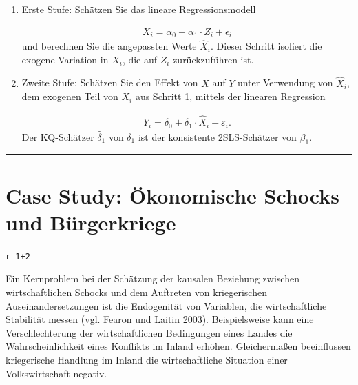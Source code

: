 \documentclass[
  a4paper,
  DIV=11,
  oneside]{scrreprt}
\begin{document}
\begin{enumerate}
\def\labelenumi{\arabic{enumi}.}
\item
  Erste Stufe: Schätzen Sie das lineare Regressionsmodell

  \begin{align}
   X_i = \alpha_0 + \alpha_1 \cdot Z_i + \epsilon_i
   \end{align} und berechnen Sie die angepassten Werte
  \(\widehat{X}_i\). Dieser Schritt isoliert die exogene Variation in
  \(X_i\), die auf \(Z_i\) zurückzuführen ist.
\item
  Zweite Stufe: Schätzen Sie den Effekt von \(X\) auf \(Y\) unter
  Verwendung von \(\widehat{X}_i\), dem exogenen Teil von \(X_i\) aus
  Schritt 1, mittels der linearen Regression

  \begin{align}
   Y_i = \delta_0 + \delta_1 \cdot \widehat{X}_i  + \varepsilon_i.
   \end{align} Der KQ-Schätzer \(\widehat{\delta}_1\) von \(\delta_1\)
  ist der konsistente 2SLS-Schätzer von \(\beta_1\).
\end{enumerate}

\begin{center}\rule{0.5\linewidth}{0.5pt}\end{center}

\section{Case Study: Ökonomische Schocks und
Bürgerkriege}\label{case-study-uxf6konomische-schocks-und-buxfcrgerkriege}

\texttt{\textasciigrave{}r\ 1+2\textasciigrave{}}

Ein Kernproblem bei der Schätzung der kausalen Beziehung zwischen
wirtschaftlichen Schocks und dem Auftreten von kriegerischen
Auseinandersetzungen ist die Endogenität von Variablen, die
wirtschaftliche Stabilität messen (vgl. Fearon und Laitin 2003).
Beispielsweise kann eine Verschlechterung der wirtschaftlichen
Bedingungen eines Landes die Wahrscheinlichkeit eines Konflikts im
Inland erhöhen. Gleichermaßen beeinflussen kriegerische Handlung im
Inland die wirtschaftliche Situation einer Volkswirtschaft negativ.
\end{document}
